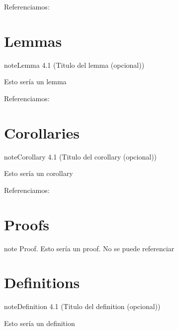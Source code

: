 \documentclass[letterpaper,10pt,english]{jupyterBook}
\begin{document}
\sphinxAtStartPar
Referenciamos: {\hyperref[\detokenize{docs/04_00_Teoremas_pruebas_y_algoritmos:my-theorem}]{}}


\section{Lemmas}
\label{\detokenize{docs/04_00_Teoremas_pruebas_y_algoritmos:lemmas}}\label{docs/04_00_Teoremas_pruebas_y_algoritmos:my-lemma}
\begin{sphinxadmonition}{note}{Lemma 4.1 (Titulo del lemma (opcional))}



\sphinxAtStartPar
Esto sería un lemma
\end{sphinxadmonition}

\sphinxAtStartPar
Referenciamos: {\hyperref[\detokenize{docs/04_00_Teoremas_pruebas_y_algoritmos:my-lemma}]{}}


\section{Corollaries}
\label{\detokenize{docs/04_00_Teoremas_pruebas_y_algoritmos:corollaries}}\label{docs/04_00_Teoremas_pruebas_y_algoritmos:my-corollary}
\begin{sphinxadmonition}{note}{Corollary 4.1 (Titulo del corollary (opcional))}



\sphinxAtStartPar
Esto sería un corollary
\end{sphinxadmonition}

\sphinxAtStartPar
Referenciamos: {\hyperref[\detokenize{docs/04_00_Teoremas_pruebas_y_algoritmos:my-corollary}]{}}


\section{Proofs}
\label{\detokenize{docs/04_00_Teoremas_pruebas_y_algoritmos:proofs}}
\begin{sphinxadmonition}{note}
\sphinxAtStartPar
Proof.
Esto sería un proof. No se puede referenciar
\end{sphinxadmonition}


\section{Definitions}
\label{\detokenize{docs/04_00_Teoremas_pruebas_y_algoritmos:definitions}}\label{docs/04_00_Teoremas_pruebas_y_algoritmos:my-definition}
\begin{sphinxadmonition}{note}{Definition 4.1 (Titulo del definition (opcional))}



\sphinxAtStartPar
Esto sería un definition
\end{sphinxadmonition}
\end{document}
